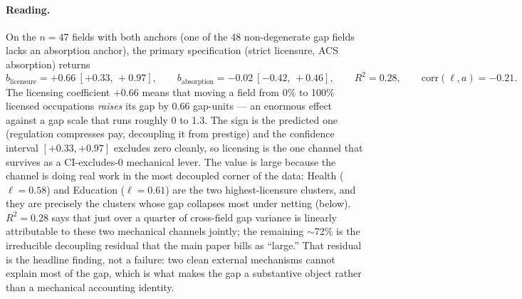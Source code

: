 \documentclass[11pt]{article}
\begin{document}
\paragraph{Reading.} On the $n{=}47$ fields with both anchors (one of the 48 non-degenerate gap fields lacks an absorption anchor), the primary specification (strict licensure, ACS absorption) returns
\[
b_{\text{licensure}} = +0.66\ [+0.33,\,+0.97], \qquad
b_{\text{absorption}} = -0.02\ [-0.42,\,+0.46], \qquad
R^2 = 0.28, \qquad
\mathrm{corr}(\ell,a) = -0.21.
\]
The licensing coefficient $+0.66$ means that moving a field from 0\% to 100\% licensed occupations \emph{raises} its gap by 0.66 gap-units --- an enormous effect against a gap scale that runs roughly 0 to 1.3. The sign is the predicted one (regulation compresses pay, decoupling it from prestige) and the confidence interval $[+0.33,+0.97]$ excludes zero cleanly, so licensing is the one channel that survives as a CI-excludes-0 mechanical lever. The value is large because the channel is doing real work in the most decoupled corner of the data: Health ($\ell=0.58$) and Education ($\ell=0.61$) are the two highest-licensure clusters, and they are precisely the clusters whose gap collapses most under netting (below). $R^2=0.28$ says that just over a quarter of cross-field gap variance is linearly attributable to these two mechanical channels jointly; the remaining $\sim$72\% is the irreducible decoupling residual that the main paper bills as ``large.'' That residual is the headline finding, not a failure: two clean external mechanisms cannot explain most of the gap, which is what makes the gap a substantive object rather than a mechanical accounting identity.
\end{document}
